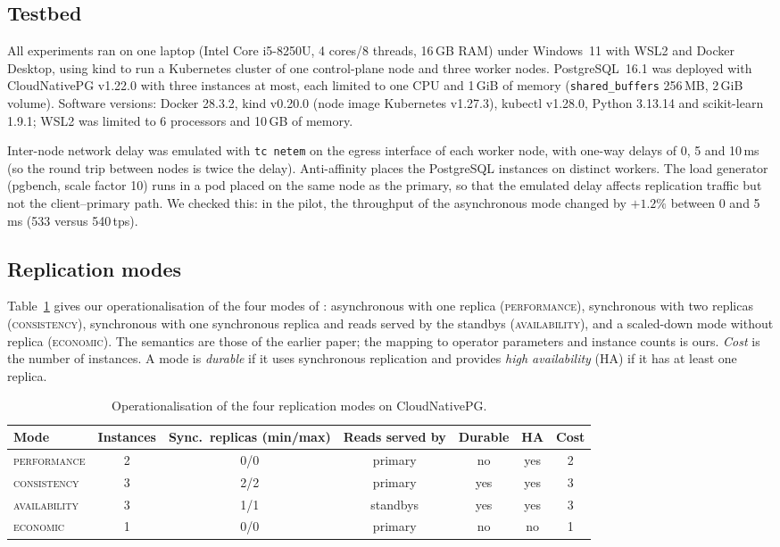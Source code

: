 \documentclass[preprint,12pt]{elsarticle}
\newcommand{\perf}{\textsc{performance}}
\newcommand{\cons}{\textsc{consistency}}
\newcommand{\avail}{\textsc{availability}}
\newcommand{\econ}{\textsc{economic}}
\begin{document}
\subsection{Testbed}
All experiments ran on one laptop (Intel Core i5-8250U, 4 cores/8 threads, 16\,GB RAM) under Windows~11 with WSL2 and Docker Desktop, using kind to run a Kubernetes cluster of one control-plane node and three worker nodes. PostgreSQL~16.1 was deployed with CloudNativePG v1.22.0 with three instances at most, each limited to one CPU and 1\,GiB of memory (\texttt{shared\_buffers} 256\,MB, 2\,GiB volume). Software versions: Docker 28.3.2, kind v0.20.0 (node image Kubernetes v1.27.3), kubectl v1.28.0, Python 3.13.14 and scikit-learn 1.9.1; WSL2 was limited to 6 processors and 10\,GB of memory.

Inter-node network delay was emulated with \texttt{tc netem} \cite{hemminger2005} on the egress interface of each worker node, with one-way delays of 0, 5 and 10\,ms (so the round trip between nodes is twice the delay). Anti-affinity places the PostgreSQL instances on distinct workers. The load generator (pgbench, scale factor 10) runs in a pod placed on the same node as the primary, so that the emulated delay affects replication traffic but not the client--primary path. We checked this: in the pilot, the throughput of the asynchronous mode changed by $+1.2\%$ between 0 and 5\,ms (533 versus 540\,tps).

\subsection{Replication modes}
Table~\ref{tab:modes} gives our operationalisation of the four modes of \cite{jerrari2026iaha}: asynchronous with one replica (\perf), synchronous with two replicas (\cons), synchronous with one synchronous replica and reads served by the standbys (\avail), and a scaled-down mode without replica (\econ). The semantics are those of the earlier paper; the mapping to operator parameters and instance counts is ours. \emph{Cost} is the number of instances. A mode is \emph{durable} if it uses synchronous replication and provides \emph{high availability} (HA) if it has at least one replica.

\begin{table}[t]
\centering\small
\begin{tabular}{lcccccc}
\toprule
Mode & Instances & Sync.\ replicas (min/max) & Reads served by & Durable & HA & Cost \\
\midrule
\perf & 2 & 0/0 & primary & no & yes & 2 \\
\cons & 3 & 2/2 & primary & yes & yes & 3 \\
\avail & 3 & 1/1 & standbys & yes & yes & 3 \\
\econ & 1 & 0/0 & primary & no & no & 1 \\
\bottomrule
\end{tabular}
\caption{Operationalisation of the four replication modes on CloudNativePG.}\label{tab:modes}
\end{table}
\end{document}
